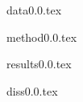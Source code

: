 \documentclass[useAMS,usenatbib]{mn2e}
\begin{document}
{data0.0.tex}


{method0.0.tex}

{results0.0.tex}

{diss0.0.tex}






\end{document}
